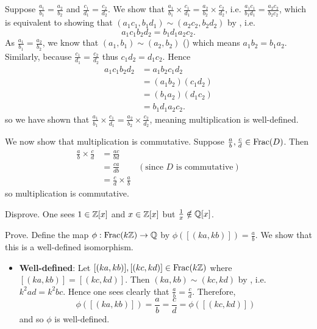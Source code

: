 \begin{questions}
    \item Suppose $\frac{a_1}{b_1} = \frac{a_2}{b_2}$ and $\frac{c_1}{d_1} = \frac{c_2}{d_2}$. We show that $\frac{a_1}{b_1} \times \frac{c_1}{d_1} = \frac{a_2}{b_2} \times \frac{c_2}{d_2}$, i.e. $\frac{a_1c_1}{b_1d_1} = \frac{a_2c_2}{b_2c_2}$, which is equivalent to showing that $(a_1c_1, b_1d_1) \mathrel{\sim} (a_2c_2, b_2d_2)$ by , i.e.
    \[
        a_1c_1b_2d_2 = b_1d_1a_2c_2.
    \]
    As $\frac{a_1}{b_1} = \frac{a_2}{b_2}$, we know that $(a_1, b_1) \mathrel{\sim} (a_2, b_2)$ () which means $a_1b_2 = b_1a_2$. Similarly, because $\frac{c_1}{d_1} = \frac{c_2}{d_2}$ thus $c_1d_2 = d_1c_2$. Hence
    \begin{align*}
        a_1c_1b_2d_2 &= a_1b_2c_1d_2\\
        &= (a_1b_2)(c_1d_2)\\
        &= (b_1a_2)(d_1c_2)\\
        &= b_1d_1a_2c_2.
    \end{align*}
    so we have shown that $\frac{a_1}{b_1} \times \frac{c_1}{d_1} = \frac{a_2}{b_2} \times \frac{c_2}{d_2}$, meaning multiplication is well-defined.

    We now show that multiplication is commutative. Suppose $\frac ab, \frac cd \in \mathrm{Frac}(D)$. Then
    \begin{align*}
        \frac ab \times \frac cd &= \frac{ac}{bd}\\
        &= \frac{ca}{db} & (\text{since } D \text{ is commutative})\\
        &= \frac cd \times \frac ab
    \end{align*}
    so multiplication is commutative.

    \item \begin{partquestions}{\alph*}
        \item Disprove. One sees $1 \in \mathbb{Z}[x]$ and $x \in \mathbb{Z}[x]$ but $\frac1x \notin \mathbb{Q}[x]$.

        \item Prove. Define the map $\phi: \mathrm{Frac}(k\mathbb{Z}) \to \mathbb{Q}$ by $\phi([(ka, kb)]) = \frac ab$. We show that this is a well-defined isomorphism.
        \begin{itemize}
            \item \textbf{Well-defined}: Let $[(ka, kb)], [(kc, kd)] \in \mathrm{Frac}(k\mathbb{Z})$ where $[(ka,kb)]=[(kc,kd)]$. Then $(ka, kb) \mathrel{\sim} (kc, kd)$ by , i.e. $k^2ad = k^2bc$. Hence one sees clearly that $\frac ab = \frac cd$. Therefore,
            \[
                \phi([(ka,kb)]) = \frac ab = \frac cd = \phi([(kc, kd)])
            \]
            and so $\phi$ is well-defined.


\end{itemize}
\end{partquestions}
\end{questions}
